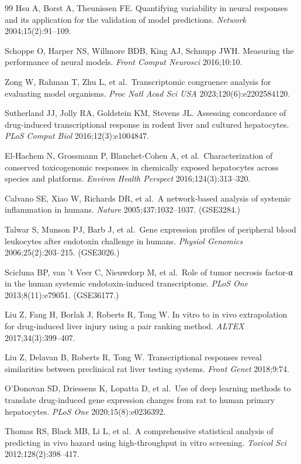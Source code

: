 \documentclass[11pt,a4paper]{article}
\begin{document}
\begin{thebibliography}{99}
Hsu A, Borst A, Theunissen FE. Quantifying variability in neural responses and its application for the validation of model predictions. \emph{Network} 2004;15(2):91--109.

Schoppe O, Harper NS, Willmore BDB, King AJ, Schnupp JWH. Measuring the performance of neural models. \emph{Front Comput Neurosci} 2016;10:10.

Zong W, Rahman T, Zhu L, et al.~Transcriptomic congruence analysis for evaluating model organisms. \emph{Proc Natl Acad Sci USA} 2023;120(6):e2202584120.

Sutherland JJ, Jolly RA, Goldstein KM, Stevens JL. Assessing concordance of drug-induced transcriptional response in rodent liver and cultured hepatocytes. \emph{PLoS Comput Biol} 2016;12(3):e1004847.

El-Hachem N, Grossmann P, Blanchet-Cohen A, et al.~Characterization of conserved toxicogenomic responses in chemically exposed hepatocytes across species and platforms. \emph{Environ Health Perspect} 2016;124(3):313--320.

Calvano SE, Xiao W, Richards DR, et al.~A network-based analysis of systemic inflammation in humans. \emph{Nature} 2005;437:1032--1037. (GSE3284.)

Talwar S, Munson PJ, Barb J, et al.~Gene expression profiles of peripheral blood leukocytes after endotoxin challenge in humans. \emph{Physiol Genomics} 2006;25(2):203--215. (GSE3026.)

Scicluna BP, van 't Veer C, Nieuwdorp M, et al.~Role of tumor necrosis factor-α in the human systemic endotoxin-induced transcriptome. \emph{PLoS One} 2013;8(11):e79051. (GSE36177.)

Liu Z, Fang H, Borlak J, Roberts R, Tong W. In vitro to in vivo extrapolation for drug-induced liver injury using a pair ranking method. \emph{ALTEX} 2017;34(3):399--407.

Liu Z, Delavan B, Roberts R, Tong W. Transcriptional responses reveal similarities between preclinical rat liver testing systems. \emph{Front Genet} 2018;9:74.

O'Donovan SD, Driessens K, Lopatta D, et al.~Use of deep learning methods to translate drug-induced gene expression changes from rat to human primary hepatocytes. \emph{PLoS One} 2020;15(8):e0236392.

Thomas RS, Black MB, Li L, et al.~A comprehensive statistical analysis of predicting in vivo hazard using high-throughput in vitro screening. \emph{Toxicol Sci} 2012;128(2):398--417.


\end{thebibliography}
\end{document}
